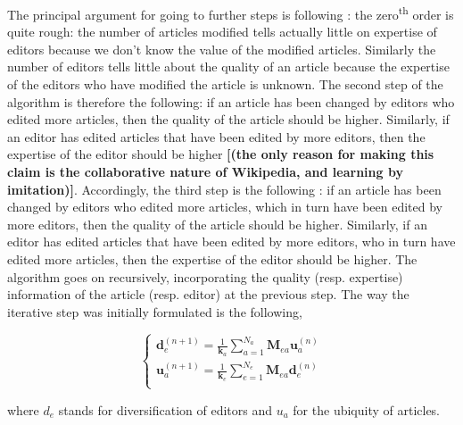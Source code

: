 The principal argument for going to further steps is following : the zero\textsuperscript{th} order is quite rough: the number of articles modified tells actually little on expertise of editors because we don't know the value of the modified articles. Similarly the number of editors tells little about the quality of an article because the expertise of the editors who have modified the article is unknown. The second step of the algorithm is therefore the following: if an article has been changed by editors who edited more articles, then the quality of the article should be higher. Similarly, if an editor has edited articles that have been edited by more editors, then the expertise of the editor should be higher {\bf [(the only reason for making this claim is the collaborative nature of Wikipedia, and learning by imitation)]}. Accordingly, the third step is the following : if an article has been changed by editors who edited more articles, which in turn have been edited by more editors, then the quality of the article should be higher. Similarly, if an editor has edited articles that have been edited by more editors, who in turn have edited more articles, then the expertise of the editor should be higher. The algorithm goes on recursively, incorporating the quality (resp. expertise) information of the article (resp. editor) at the previous step. The way the iterative step was initially formulated is the following,

\begin{equation}
\begin{cases}
 \mathbf{d}_{e}^{(n+1)} = \frac{1}{\mathbf{k}_a} \sum_{a=1}^{N_{a}} \mathbf{M}_{ea} \mathbf{u}_{a}^{(n)}\\
 \mathbf{u}_{a}^{(n+1)} = \frac{1}{\mathbf{k}_e}\sum_{e=1}^{N_{e}} \mathbf{M}_{ea} \mathbf{d}_{e}^{(n)}\\
\end{cases}
\label{HHalgo}
\end{equation}

where $d_{e}$ stands for diversification of editors and $u_{a}$ for the ubiquity of articles.

